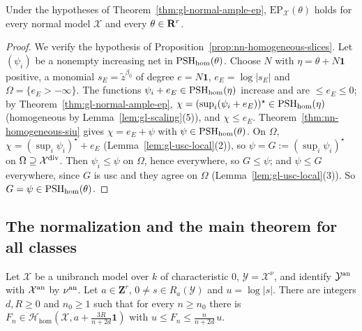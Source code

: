 \begin{corollary}\label{cor:nn-normal-ep}
\leanok
{}
Under the hypotheses of Theorem~\ref{thm:gl-normal-ample-ep}, $\mathrm{EP}_{\mathcal X}(\theta)$ holds for every normal model $\mathcal X$ and every
$\theta\in\mathbf{R}^r$.
\end{corollary}

\begin{proof}
We verify the hypothesis of Proposition~\ref{prop:nn-homogeneous-slices}. Let $(\psi_i)$ be a nonempty increasing net in $\operatorname{PSH}_{\mathrm{hom}}(\theta)$. Choose $N$
with $\eta=\theta+N\mathbf1$ positive, a monomial $s_E=\tilde z^{\beta_0}$ of degree $e=N\mathbf1$, $e_E=\log|s_E|$ and $\Omega=\{e_E>-\infty\}$. The functions
$\psi_i+e_E\in\operatorname{PSH}_{\mathrm{hom}}(\eta)$ increase and are $\le e_E\le0$; by Theorem~\ref{thm:gl-normal-ample-ep},
$\chi=(\sup_i(\psi_i+e_E))^\star\in\operatorname{PSH}_{\mathrm{hom}}(\eta)$ (homogeneous by Lemma~\ref{lem:gl-scaling}(5)), and $\chi\le e_E$. Theorem~\ref{thm:nn-homogeneous-siu}
gives $\chi=e_E+\psi$ with $\psi\in\operatorname{PSH}_{\mathrm{hom}}(\theta)$. On $\Omega$, $\chi=(\sup_i\psi_i)^\star+e_E$ (Lemma~\ref{lem:gl-usc-local}(2)), so $\psi=G:=(\sup_i\psi_i)^\star$
on $\Omega\supseteq\mathcal X^{\mathrm{div}}$. Then $\psi_i\le\psi$ on $\Omega$, hence everywhere, so $G\le\psi$; and $\psi\le G$ everywhere, since $G$ is usc and they agree on
$\Omega$ (Lemma~\ref{lem:gl-usc-local}(3)). So $G=\psi\in\operatorname{PSH}_{\mathrm{hom}}(\theta)$.
\end{proof}

\subsection{The normalization and the main theorem for all classes}\label{subsec:nn-main}

\begin{lemma}\label{lem:nn-additive-sandwich}
\leanok
{}
Let $\mathcal X$ be a unibranch model over $k$ of characteristic $0$, $\mathcal Y=\mathcal X^\nu$, and identify $\mathcal Y^{\mathrm{an}}$ with $\mathcal X^{\mathrm{an}}$ by
$\nu^{\mathrm{an}}$. Let $a\in\mathbf Z^r$, $0\ne s\in R_a(\mathcal Y)$ and $u=\log|s|$. There are integers $d,R\ge0$ and $n_0\ge1$ such that for every $n\ge n_0$ there is
$F_n\in\mathcal H_{\mathrm{hom}}(\mathcal X,a+\frac{3R}{n+2d}\mathbf1)$ with $u\le F_n\le\frac n{n+2d}\,u$.
\end{lemma}

